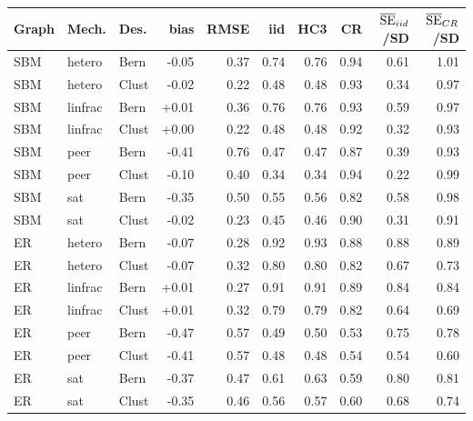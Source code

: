 \begin{tabular}{lllrrrrrrr}
\toprule
Graph & Mech. & Des. & bias & RMSE & iid & HC3 & CR & $\overline{\rm SE}_{iid}$/SD & $\overline{\rm SE}_{CR}$/SD \\
\midrule
SBM & hetero & Bern & -0.05 & 0.37 & 0.74 & 0.76 & 0.94 & 0.61 & 1.01 \\
SBM & hetero & Clust & -0.02 & 0.22 & 0.48 & 0.48 & 0.93 & 0.34 & 0.97 \\
SBM & linfrac & Bern & +0.01 & 0.36 & 0.76 & 0.76 & 0.93 & 0.59 & 0.97 \\
SBM & linfrac & Clust & +0.00 & 0.22 & 0.48 & 0.48 & 0.92 & 0.32 & 0.93 \\
SBM & peer & Bern & -0.41 & 0.76 & 0.47 & 0.47 & 0.87 & 0.39 & 0.93 \\
SBM & peer & Clust & -0.10 & 0.40 & 0.34 & 0.34 & 0.94 & 0.22 & 0.99 \\
SBM & sat & Bern & -0.35 & 0.50 & 0.55 & 0.56 & 0.82 & 0.58 & 0.98 \\
SBM & sat & Clust & -0.02 & 0.23 & 0.45 & 0.46 & 0.90 & 0.31 & 0.91 \\
ER & hetero & Bern & -0.07 & 0.28 & 0.92 & 0.93 & 0.88 & 0.88 & 0.89 \\
ER & hetero & Clust & -0.07 & 0.32 & 0.80 & 0.80 & 0.82 & 0.67 & 0.73 \\
ER & linfrac & Bern & +0.01 & 0.27 & 0.91 & 0.91 & 0.89 & 0.84 & 0.84 \\
ER & linfrac & Clust & +0.01 & 0.32 & 0.79 & 0.79 & 0.82 & 0.64 & 0.69 \\
ER & peer & Bern & -0.47 & 0.57 & 0.49 & 0.50 & 0.53 & 0.75 & 0.78 \\
ER & peer & Clust & -0.41 & 0.57 & 0.48 & 0.48 & 0.54 & 0.54 & 0.60 \\
ER & sat & Bern & -0.37 & 0.47 & 0.61 & 0.63 & 0.59 & 0.80 & 0.81 \\
ER & sat & Clust & -0.35 & 0.46 & 0.56 & 0.57 & 0.60 & 0.68 & 0.74 \\
\bottomrule
\end{tabular}
